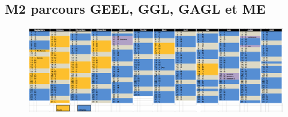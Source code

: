 \documentclass[a4paper,11pt]{article}
\begin{document}

\subsection{M2 parcours GEEL, GGL, GAGL et ME}
\begin{figure}[H]
	\centering
		\includegraphics[width=1.4\textwidth, angle=90]{Calendriers/calendrierM2GAGL.png}
	\label{calM2GAGL}
\end{figure}

\end{document}
